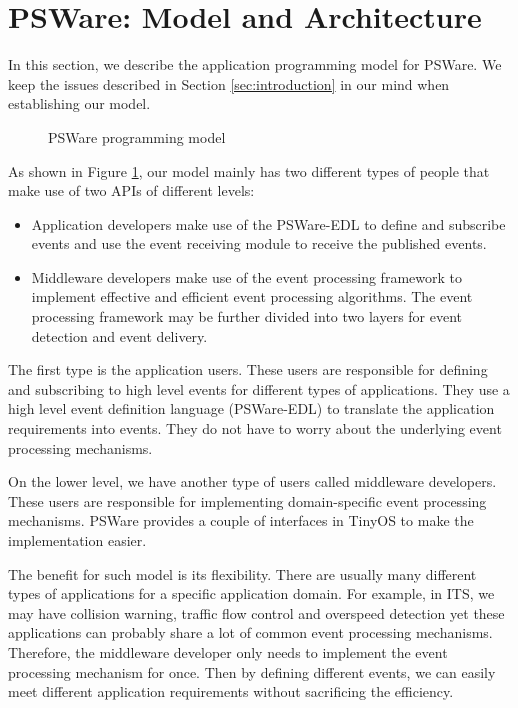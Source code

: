 \section{PSWare: Model and Architecture}
\label{sec:model}
In this section, we describe the application programming model for PSWare. We keep the issues described in Section \ref{sec:introduction} in our mind when establishing our model.

\begin{figure}
\centering
\caption{PSWare programming model}
\label{fig:programmingModel}
\end{figure}

As shown in Figure \ref{fig:programmingModel}, our model mainly has two different types of people that make use of two APIs of different levels:
\begin{itemize}
\item Application developers make use of the PSWare-EDL to define and subscribe events and use the event receiving module to receive the published events.
\item Middleware developers make use of the event processing framework to implement effective and efficient event processing algorithms. The event processing framework may be further divided into two layers for event detection and event delivery.
\end{itemize}

The first type is the application users. These users are responsible for defining and subscribing to high level events for different types of applications. They use a high level event definition language (PSWare-EDL) to translate the application requirements into events. They do not have to worry about the underlying event processing mechanisms.

On the lower level, we have another type of users called middleware developers. These users are responsible for implementing domain-specific event processing mechanisms. PSWare provides a couple of interfaces in TinyOS to make the implementation easier.

The benefit for such model is its flexibility. There are usually many different types of applications for a specific application domain. For example, in ITS, we may have collision warning, traffic flow control and overspeed detection yet these applications can probably share a lot of common event processing mechanisms. Therefore, the middleware developer only needs to implement the event processing mechanism for once. Then by defining different events, we can easily meet different application requirements without sacrificing the efficiency.


